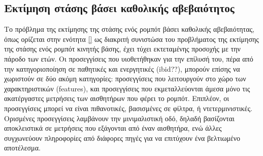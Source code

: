 \subsection{Εκτίμηση στάσης βάσει καθολικής αβεβαιότητος}
\label{subsection:02_03_02:01}


Το πρόβλημα της εκτίμησης της στάσης ενός ρομπότ βάσει καθολικής αβεβαιότητας,
όπως ορίζεται στην ενότητα \ref{} ως διακριτή συνιστώσα του προβλήματος της
εκτίμησης της στάσης ενός ρομπότ κινητής βάσης, έχει τύχει εκτεταμένης προσοχής
με την πάροδο των ετών. Οι προσεγγίσεις που υιοθετήθηκαν για την επίλυσή του,
πέρα από την κατηγοριοποίηση σε παθητικές και ενεργητικές (ibid??), μπορούν
επίσης να χωριστούν σε δύο ακόμη κατηγορίες: προσεγγίσεις που λειτουργούν στο
χώρο των χαρακτηριστικών (features), και προσεγγίσεις που εκμεταλλεύονται άμεσα
μόνο τις ακατέργαστες μετρήσεις των αισθητήρων που φέρει το ρομπότ. Επιπλέον,
οι προσεγγίσεις μπορεί να είναι πιθανοτικές, βασισμένες σε φίλτρα, ή
ντετερμινιστικές. Ορισμένες προσεγγίσεις λαμβάνουν την μινιμαλιστική οδό,
δηλαδή βασίζονται αποκλειστικά σε μετρήσεις που εξάγονται από έναν αισθητήρα,
ενώ άλλες συγχωνεύουν πληροφορίες από διάφορες πηγές για να επιτύχουν ένα
βελτιωμένο αποτέλεσμα.

